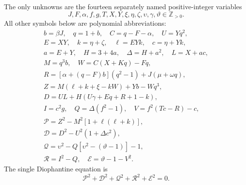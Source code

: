 The only unknowns are the fourteen separately named positive-integer variables
\[
J,F,\alpha,f,g,T,X,Y,\xi,\eta,\zeta,\upsilon,\gamma,\vartheta\in\mathbb Z_{>0}.
\]
All other symbols below are polynomial abbreviations:
\[
\begin{gathered}
b=\beta J,\quad q=1+b,\quad C=q-F-\alpha,\quad U=Yq^2,\\
E=XY,\quad k=\eta+\zeta,\quad \ell=EYk,\quad c=\eta+Yk,\\
a=E+Y,\quad H=3+4a,\quad\Delta=H+a^2,\quad L=X+ac,\\
M=q^3b,\quad W=C(X+Kq)-Fq,\\
R=[\alpha+(q-F)b](q^2-1)+J(\mu+\omega q),\\
Z=M(\ell+k+\xi-kW)+Yb-Wq^3,\\
D=UL+H(U\gamma+Eq+R+1-k),\\
I=c^2g,\quad Q=\Delta(f^2-1),\quad V=f^2(Tc-R)-c,\\
\mathcal{P}=Z^2-M^2[1+\ell(\ell+k)],\\
\mathcal{D}=D^2-U^2(1+\Delta c^2),\\
\mathcal{Q}=\upsilon^2-Q[\upsilon^2-(\vartheta-1)]-1,\\
\mathcal{R}=I^2-Q,\quad \mathcal{E}=\vartheta-1-V^2.
\end{gathered}
\]
The single Diophantine equation is
\[
\boxed{\mathcal{P}^2+\mathcal{D}^2+\mathcal{Q}^2+\mathcal{R}^2+\mathcal{E}^2=0.}
\]
